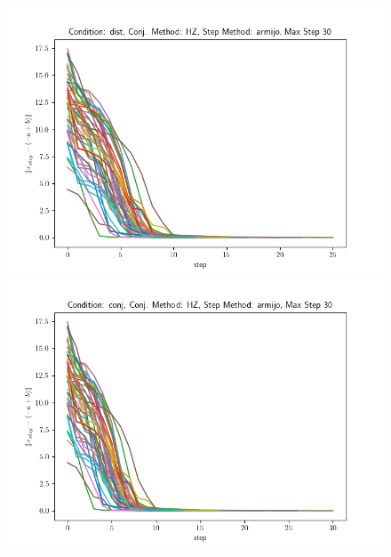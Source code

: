 \documentclass[a4paper,twocolumn,12pt]{article}
\begin{document}
{\begin{figure}[h]
    \begin{minipage}[h]{0.49\linewidth}
      \includegraphics[width=1\linewidth]{./imgs/img5.png}
    \end{minipage}
    \hfill      
    \begin{minipage}[h]{0.49\linewidth}
      \includegraphics[width=1\linewidth]{./imgs/img6.png}
    \end{minipage}
    

\end{figure}}
\end{document}
